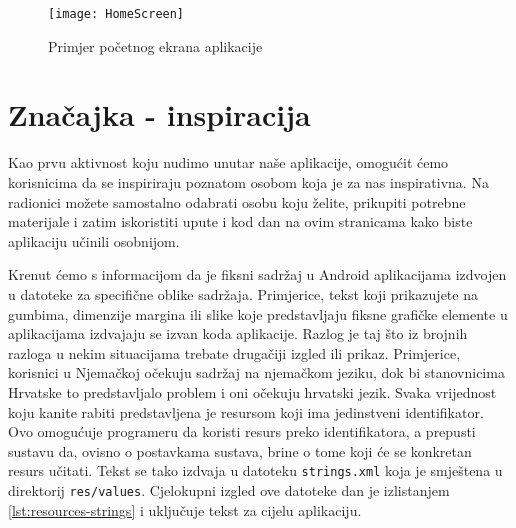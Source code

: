 \documentclass[11pt,a4paper,twoside]{article}
\begin{document}
\begin{figure}[!h]
	\centering
	\texttt{[image: HomeScreen]}
	\caption{Primjer početnog ekrana aplikacije}	
	\label{fig:HomeScreen}
\end{figure}

\section{Značajka - inspiracija}

Kao prvu aktivnost koju nudimo unutar naše aplikacije, omogućit ćemo korisnicima da se inspiriraju poznatom osobom koja je za nas inspirativna. Na radionici možete samostalno odabrati osobu koju želite, prikupiti potrebne materijale i zatim iskoristiti upute i kod dan na ovim stranicama kako biste aplikaciju učinili osobnijom. 

Krenut ćemo s informacijom da je fiksni sadržaj u Android aplikacijama izdvojen u datoteke za specifične oblike sadržaja. Primjerice, tekst koji prikazujete na gumbima, dimenzije margina ili slike koje predstavljaju fiksne grafičke elemente u aplikacijama izdvajaju se izvan koda aplikacije. Razlog je taj što iz brojnih razloga u nekim situacijama trebate drugačiji izgled ili prikaz. Primjerice, korisnici u Njemačkoj očekuju sadržaj na njemačkom jeziku, dok bi stanovnicima Hrvatske to predstavljalo problem i oni očekuju hrvatski jezik. Svaka vrijednost koju kanite rabiti predstavljena je resursom koji ima jedinstveni identifikator. Ovo omogućuje programeru da koristi resurs preko identifikatora, a prepusti sustavu da, ovisno o postavkama sustava, brine o tome koji će se konkretan resurs učitati. Tekst se tako izdvaja u datoteku \texttt{strings.xml} koja je smještena u direktorij \texttt{res/values}. Cjelokupni izgled ove datoteke dan je izlistanjem \ref{lst:resources-strings} i uključuje tekst za cijelu aplikaciju.
\end{document}
